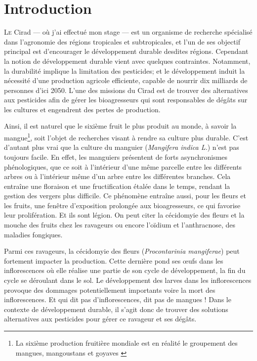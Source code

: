 \chapter{Introduction}

\lettrine{L}{e} Cirad --- où j'ai effectué mon stage --- est un organisme de recherche spécialisé dans l'agronomie des régions tropicales et subtropicales, et l'un de ses objectif principal est d'encourager le développement durable desdites régions.
Cependant la notion de développement durable vient avec quelques contraintes.
Notamment, la durabilité implique la limitation des pesticides; et le développement induit la nécessité d'une production agricole efficiente, capable de nourrir dix milliards de personnes d'ici 2050.
L'une des missions du Cirad est de trouver des alternatives aux pesticides afin de gérer les bioagresseurs qui sont responsables de dégâts sur les cultures et engendrent des pertes de production.

Ainsi, il est naturel que le sixième fruit le plus produit au monde, à savoir la mangue\footnote{La sixième production fruitière mondiale est en réalité le groupement des mangues, mangoustans et goyaves \citep{fao}}, soit l'objet de recherches visant à rendre sa culture plus durable.
C'est d'autant plus vrai que la culture du manguier (\emph{Mangifera indica L.}) n'est pas toujours facile.
En effet, les manguiers présentent de forts asynchronismes phénologiques, que ce soit à l'intérieur d'une même parcelle entre les différents arbres ou à l'intérieur même d'un arbre entre les différentes branches.
Cela entraîne une floraison et une fructification étalée dans le temps, rendant la gestion des vergers plus difficile.
Ce phénomène entraîne aussi, pour les fleurs et les fruits, une fenêtre d'exposition prolongée aux bioagresseurs, ce qui favorise leur prolifération.
Et ils sont légion.
On peut citer la cécidomyie des fleurs et la mouche des fruits chez les ravageurs ou encore l'oïdium et l'anthracnose, des maladies fongiques.

Parmi ces ravageurs, la cécidomyie des fleurs (\emph{Procontarinia mangiferae}) peut fortement impacter la production.
Cette dernière pond ses œufs dans les inflorescences où elle réalise une partie de son cycle de développement, la fin du cycle se déroulant dans le sol.
Le développement des larves dans les inflorescences provoque des dommages potentiellement importants voire la mort des inflorescences. 
Et qui dit pas d'inflorescences, dit pas de mangues !
Dans le contexte de développement durable, il s'agit donc de trouver des solutions alternatives aux pesticides pour gérer ce ravageur et ses dégâts.

